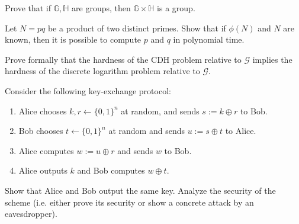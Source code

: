 \documentclass[12pt,letterpaper,boxed]{amspset}
\begin{document}
\begin{problem}[7.5]
Prove that if $\mathbb{G}, \mathbb{H}$ are groups, then $\mathbb{G}\times \mathbb{H}$ is a group.
\end{problem}

\begin{solution}
\vspace{5cm}

\end{solution}

\begin{problem}[7.6]
Let $N=pq$ be a product of two distinct primes. Show that if $\phi(N)$ and $N$ are known, then it is possible to compute $p$ and $q$ in polynomial time.
\end{problem}

\begin{solution}
\vspace{3cm}

\end{solution}

\begin{problem}[7.7]
Prove formally that the hardness of the CDH problem relative to $\mathcal{G}$ implies the hardness of the discrete logarithm problem relative to $\mathcal{G}$.
\end{problem}

\begin{solution}
\vspace{8cm}

\end{solution}

\begin{problem}[9.1]
Consider the following key-exchange protocol:
\begin{enumerate}
\item Alice chooses $k,r \gets \{0,1\}^n$ at random, and sends $s:=k\oplus r$ to Bob.
\item Bob chooses $t \gets \{0,1\}^n$ at random and sends $u := s\oplus t$ to Alice.
\item Alice computes $w := u\oplus r$ and sends $w$ to Bob.
\item Alice outputs $k$ and Bob computes $w \oplus t$.
\end{enumerate}
Show that Alice and Bob output the same key. Analyze the security of the scheme (i.e. either prove its security or show a concrete attack by an eavesdropper).
\end{problem}

\begin{solution}
\vspace{6cm}

\end{solution}
\end{document}
